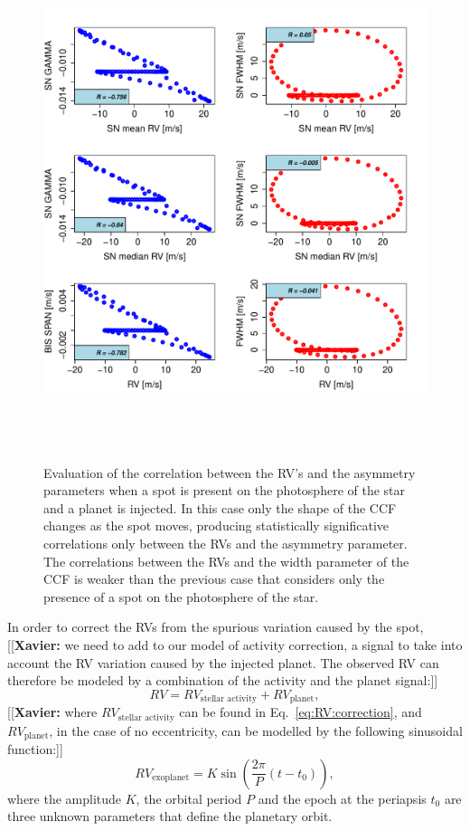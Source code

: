 \documentclass{aa}
\newcommand{\xavier}[1]{{\color{blue}[[\textbf{Xavier: }#1]]}}
\begin{document}
\begin{figure}[htbp]
   \centering
\includegraphics[height = 6in]{SOAP_SPOT_PLANET_Comparison_para_SN.pdf} 
   \caption{Evaluation of the correlation between the RV's and the asymmetry parameters when a spot is present on the photosphere of the star and a planet is injected.  In this case only the shape of the CCF changes as the spot moves, producing statistically significative correlations only between the RVs and the asymmetry parameter. The correlations between the RVs and the width parameter of the CCF is weaker than the previous case that considers only the presence of a spot on the photosphere of the star.}
    \label{fig:spot.plus.planet.corr}
\end{figure}

In order to correct the RVs from the spurious variation caused by the spot, \xavier{we need to add to our model of activity correction, a signal to take into account the RV variation caused by the injected planet. The observed RV can therefore be modeled by a combination of the activity and the planet signal:}
%
\begin{equation}
RV= RV_{\text{stellar activity}} + RV_{\text{planet}},
\label{eq:RV:correction.overall}
\end{equation}
%
\xavier{where $RV_{\text{stellar activity}}$ can be found in Eq.~\ref{eq:RV:correction}, and $RV_{\text{planet}}$, in the case of no eccentricity, can be modelled by the following sinusoidal function:}
%
\begin{equation}
RV_{\text{exoplanet}}= K \sin \left(\frac{2 \pi}{P} (t - t_{0})\right),
\label{eq:RV:correction.planet}
\end{equation}
%
where the amplitude $K$, the orbital period $P$ and the epoch at the periapsis $t_{0}$ are three unknown parameters that define the planetary orbit.
\end{document}
